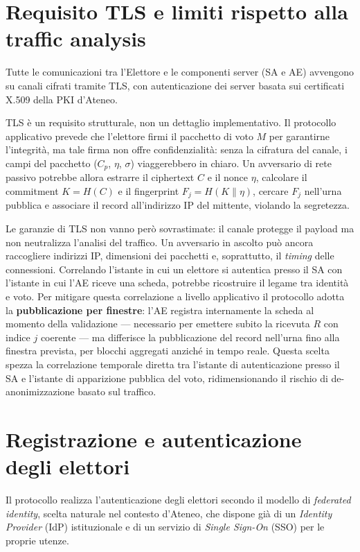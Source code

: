 \section{Requisito TLS e limiti rispetto alla traffic analysis}
\label{sec:wp2_tls}

Tutte le comunicazioni tra l'Elettore e le componenti server (SA e AE) avvengono su canali cifrati tramite TLS, con autenticazione dei server basata sui certificati X.509 della PKI d'Ateneo.

TLS è un requisito strutturale, non un dettaglio implementativo. Il protocollo applicativo prevede che l'elettore firmi il pacchetto di voto $M$ per garantirne l'integrità, ma tale firma non offre confidenzialità: senza la cifratura del canale, i campi del pacchetto ($C_p$, $\eta$, $\sigma$) viaggerebbero in chiaro. Un avversario di rete passivo potrebbe allora estrarre il ciphertext $C$ e il nonce $\eta$, calcolare il commitment $K = H(C)$ e il fingerprint $F_j = H(K \parallel \eta)$, cercare $F_j$ nell'urna pubblica e associare il record all'indirizzo IP del mittente, violando la segretezza.

Le garanzie di TLS non vanno però sovrastimate: il canale protegge il payload ma non neutralizza l'analisi del traffico. Un avversario in ascolto può ancora raccogliere indirizzi IP, dimensioni dei pacchetti e, soprattutto, il \textit{timing} delle connessioni. Correlando l'istante in cui un elettore si autentica presso il SA con l'istante in cui l'AE riceve una scheda, potrebbe ricostruire il legame tra identità e voto. Per mitigare questa correlazione a livello applicativo il protocollo adotta la \textbf{pubblicazione per finestre}: l'AE registra internamente la scheda al momento della validazione --- necessario per emettere subito la ricevuta $R$ con indice $j$ coerente --- ma differisce la pubblicazione del record nell'urna fino alla finestra prevista, per blocchi aggregati anziché in tempo reale. Questa scelta spezza la correlazione temporale diretta tra l'istante di autenticazione presso il SA e l'istante di apparizione pubblica del voto, ridimensionando il rischio di de-anonimizzazione basato sul traffico.

\section{Registrazione e autenticazione degli elettori}
\label{sec:autenticazione_elettori}

Il protocollo realizza l'autenticazione degli elettori secondo il modello di \textit{federated identity}, scelta naturale nel contesto d'Ateneo, che dispone già di un \textit{Identity Provider} (IdP) istituzionale e di un servizio di \textit{Single Sign-On} (SSO) per le proprie utenze.

